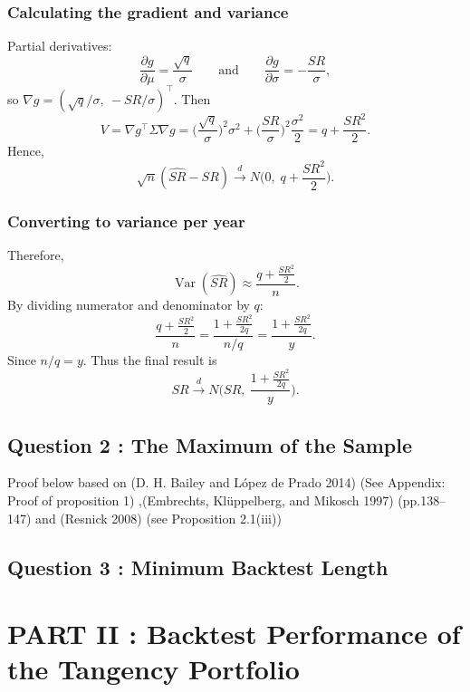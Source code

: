 \documentclass[
  12pt,
]{article}
\begin{document}
\subsubsection{Calculating the gradient and
variance}\label{calculating-the-gradient-and-variance}

Partial derivatives: \[
\frac{\partial g}{\partial\mu}=\frac{\sqrt{q}}{\sigma} \qquad \text{and} \qquad
\frac{\partial g}{\partial\sigma}=-\frac{SR}{\sigma},
\] so \(\nabla g=(\sqrt{q}/\sigma,\ -SR/\sigma)^\top\). Then \[
V=\nabla g^\top\Sigma\nabla g
= \Big(\frac{\sqrt{q}}{\sigma}\Big)^2\sigma^2 + \Big(\frac{SR}{\sigma}\Big)^2\frac{\sigma^2}{2}
= q + \frac{SR^2}{2}.
\] Hence, \[
\sqrt{n}(\widehat{SR}-SR)\xrightarrow{d} N\!\Big(0,\; q+\frac{SR^2}{2}\Big).
\]

\subsubsection{Converting to variance per
year}\label{converting-to-variance-per-year}

Therefore,\[
\operatorname{Var}(\widehat{SR})\approx\frac{q+\tfrac{SR^2}{2}}{n}.
\] By dividing numerator and denominator by \(q\): \[
\frac{q+\tfrac{SR^2}{2}}{n}=\frac{1+\tfrac{SR^2}{2q}}{\,n/q\,}= \frac{1+\tfrac{SR^2}{2q}}{y}.
\] Since \(n/q=y\). Thus the final result is \[
\widehat{SR}\xrightarrow{d} N\!\Big(SR,\ \frac{1+\tfrac{SR^2}{2q}}{y}\Big).
\]

\subsection{Question 2 : The Maximum of the
Sample}\label{question-2-the-maximum-of-the-sample}

Proof below based on (D. H. Bailey and López de Prado 2014) (See
Appendix: Proof of proposition 1) ,(Embrechts, Klüppelberg, and Mikosch
1997) (pp.138--147) and (Resnick 2008) (see Proposition 2.1(iii))

\subsection{Question 3 : Minimum Backtest
Length}\label{question-3-minimum-backtest-length}

\section{PART II : Backtest Performance of the Tangency
Portfolio}\label{part-ii-backtest-performance-of-the-tangency-portfolio}
\end{document}
